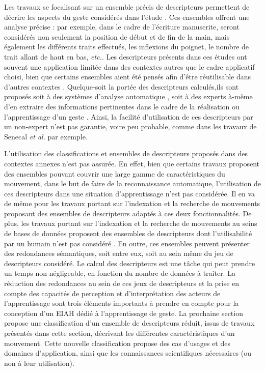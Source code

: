 Les travaux se focalisant sur un ensemble précis de descripteurs permettent de décrire les aspects du geste considérés dans l'étude \parencite{Senecal2018MAa} \parencite{Aristidou2015FDE} \parencite{Delaye2013HBF}. Ces ensembles offrent une analyse précise : par exemple, dans le cadre de l'écriture manuscrite, seront considérés non seulement la position de début et de fin de la main, mais également les différents traits effectués, les inflexions du poignet, le nombre de trait allant de haut en bas, \textit{etc.}. Les descripteurs présents dans ces études ont souvent une application limitée dans des contextes autres que le cadre applicatif choisi, bien que certains ensembles aient été pensés afin d'être réutilisable dans d'autres contextes \parencite{Boulahia2016HIF}. Quelque-soit la portée des descripteurs calculés,ils sont proposés soit à des systèmes d'analyse automatique \parencite{Aristidou2015FDE}, soit à des experts à-même d'en extraire des informations pertinentes dans le cadre de la réalisation ou l'apprentissage d'un geste \parencite{Senecal2018MAa}. Ainsi, la facilité d'utilisation de ces descripteurs par un non-expert n'est pas garantie, voire peu probable, comme dans les travaux de Senecal \textit{et al.} par exemple\parencite{Senecal2018MAa}.

L'utilisation des classifications et ensembles de descripteurs proposés dans des contextes annexes n'est pas assurée. En effet, bien que certains travaux proposent des ensembles pouvant couvrir une large gamme de caractéristiques du mouvement, dans le but de faire de la reconnaissance automatique, l'utilisation de ces descripteurs dans une situation d'apprentissage n'est pas considérée. Il en va de même pour les travaux portant sur l'indexation et la recherche de mouvements proposant des ensembles de descripteurs adaptés à ces deux fonctionnalités. De plus, les travaux portant sur l'indexation et la recherche de mouvements au seins de bases de données proposent des ensembles de descripteurs dont l'utilisabilité par un humain n'est pas considéré \parencite{Sakurai2015Ros} \parencite{Xiao2015Sbh}. En outre, ces ensembles peuvent présenter des redondances sémantiques, soit entre eux, soit au sein même du jeu de descripteurs considéré. Le calcul des descripteurs est une tâche qui peut prendre un temps non-négligeable, en fonction du nombre de données à traiter. La réduction des redondances au sein de ces jeux de descripteurs et la prise en compte des capacités de perception et d'interprétation des acteurs de l'apprentissage sont trois éléments importants à prendre en compte pour la conception d'un EIAH dédié à l'apprentissage de geste. La prochaine section propose une classification d'un ensemble de descripteurs réduit, issus de travaux présentés dans cette section, décrivant les différentes caractéristiques d'un mouvement. Cette nouvelle classification propose des cas d'usages et des domaines d'application, ainsi que les connaissances scientifiques nécessaires (ou non à leur utilisation).

